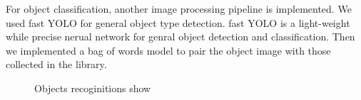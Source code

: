 For object classification, another image processing pipeline is implemented. We used fast YOLO \cite{1612.08242} for general object type detection. fast YOLO is a light-weight while precise nerual network for genral object detection and classification. Then we implemented a bag of words model \cite{csurka2004visual} to pair the object image with those collected in the library.
\begin{figure} 
	\centering 
	\hspace{0.01\linewidth}
	\vfill
	\hspace{0.01\linewidth}
	\caption{Objects recoginitions show}
	\label{fig:subfig}
\end{figure}